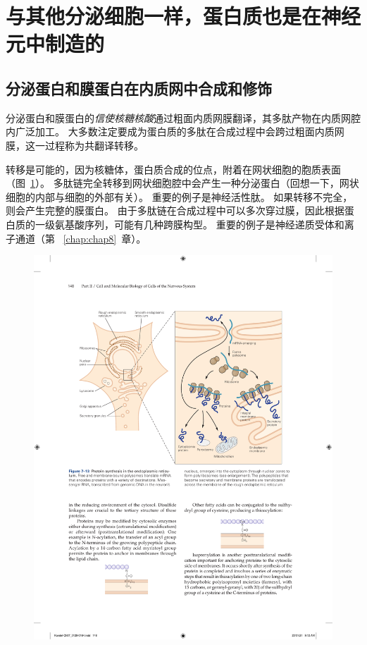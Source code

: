 \section{与其他分泌细胞一样，蛋白质也是在神经元中制造的}

\subsection{分泌蛋白和膜蛋白在内质网中合成和修饰}

分泌蛋白和膜蛋白的\textit{信使核糖核酸}通过粗面内质网膜翻译，其多肽产物在内质网腔内广泛加工。
大多数注定要成为蛋白质的多肽在合成过程中会跨过粗面内质网膜，这一过程称为共翻译转移。


转移是可能的，因为核糖体，蛋白质合成的位点，附着在网状细胞的胞质表面（图~\ref{fig:7_13}）。 
多肽链完全转移到网状细胞腔中会产生一种分泌蛋白（回想一下，网状细胞的内部与细胞的外部有关）。
重要的例子是神经活性肽。
如果转移不完全，则会产生完整的膜蛋白。
由于多肽链在合成过程中可以多次穿过膜，因此根据蛋白质的一级氨基酸序列，可能有几种跨膜构型。
重要的例子是神经递质受体和离子通道（第 ~\ref{chap:chap8}~章）。


\begin{figure}[htbp]
	\centering
	\includegraphics[width=1.0\linewidth]{chap07/fig_7_13}
	\caption{}
	\label{fig:7_13}
\end{figure}


